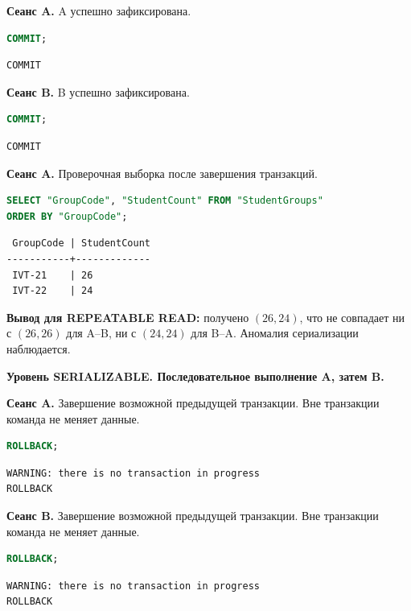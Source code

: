 \documentclass[12pt,a4paper]{article}
\begin{document}
\textbf{Сеанс A.} A успешно зафиксирована.
\begin{lstlisting}[language=SQL]
COMMIT;
\end{lstlisting}

\begin{lstlisting}
COMMIT
\end{lstlisting}

\textbf{Сеанс B.} B успешно зафиксирована.
\begin{lstlisting}[language=SQL]
COMMIT;
\end{lstlisting}

\begin{lstlisting}
COMMIT
\end{lstlisting}

\textbf{Сеанс A.} Проверочная выборка после завершения транзакций.
\begin{lstlisting}[language=SQL]
SELECT "GroupCode", "StudentCount" FROM "StudentGroups"
ORDER BY "GroupCode";
\end{lstlisting}

\begin{lstlisting}
 GroupCode | StudentCount
-----------+-------------
 IVT-21    | 26
 IVT-22    | 24
\end{lstlisting}

\textbf{Вывод для REPEATABLE READ:} получено \((26,24)\), что не совпадает ни с \((26,26)\) для A--B, ни с \((24,24)\) для B--A. Аномалия сериализации наблюдается.

\textbf{Уровень SERIALIZABLE. Последовательное выполнение A, затем B.}

\textbf{Сеанс A.} Завершение возможной предыдущей транзакции. Вне транзакции команда не меняет данные.
\begin{lstlisting}[language=SQL]
ROLLBACK;
\end{lstlisting}

\begin{lstlisting}
WARNING: there is no transaction in progress
ROLLBACK
\end{lstlisting}

\textbf{Сеанс B.} Завершение возможной предыдущей транзакции. Вне транзакции команда не меняет данные.
\begin{lstlisting}[language=SQL]
ROLLBACK;
\end{lstlisting}

\begin{lstlisting}
WARNING: there is no transaction in progress
ROLLBACK
\end{lstlisting}
\end{document}
